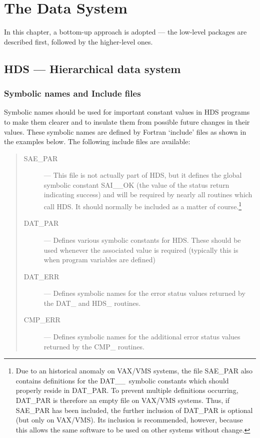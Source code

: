 \chapter{The Data System}
\label{C_datsys}

In this chapter, a bottom-up approach is adopted --- the low-level packages are
described first, followed by the higher-level ones.

\section{HDS --- Hierarchical data system}
\label{S_usehds}

\subsection{Symbolic names and Include files}

Symbolic names should be used for important constant values in HDS programs to
make them clearer and to insulate them from possible future changes in their
values.
These symbolic names are defined by Fortran `include' files as shown in the
examples below.
The following include files are available: 

\begin{quote}
\begin{description}

\item [SAE\_PAR] ---
This file is not actually part of HDS, but it defines the global symbolic
constant SAI\_\_OK (the value of the status return indicating success) and will
be required by nearly all routines which call HDS.
It should normally be included as a matter of course.\footnote{Due to an
historical anomaly on VAX/VMS systems, the file SAE\_PAR also contains
definitions for the DAT\_\_\, symbolic constants which should properly reside
in DAT\_PAR.
To prevent multiple definitions occurring, DAT\_PAR is therefore an empty file
on VAX/VMS systems.
Thus, if SAE\_PAR has been included, the further inclusion of DAT\_PAR is
optional (but only on VAX/VMS).
Its inclusion is recommended, however, because this allows the same software
to be used on other systems without change.}

\item [DAT\_PAR] ---
Defines various symbolic constants for HDS.
These should be used whenever the associated value is required (typically this
is when program variables are defined)

\item [DAT\_ERR] ---
Defines symbolic names for the error status values returned by the DAT\_ 
and HDS\_ routines.

\item [CMP\_ERR] ---
Defines symbolic names for the additional error status values returned by
the CMP\_ routines.
\end{description}
\end{quote}

